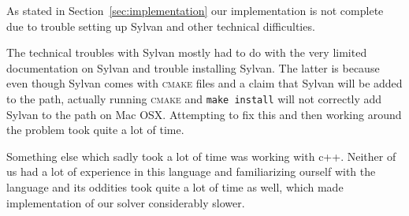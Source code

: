 As stated in Section~\ref{sec:implementation} our implementation is not
complete due to trouble setting up Sylvan and other technical difficulties.

The technical troubles with Sylvan mostly had to do with the very limited 
documentation on Sylvan and trouble installing Sylvan. The latter is because 
even though Sylvan comes with \textsc{cmake} files and a claim that Sylvan will 
be added to the path, actually running \textsc{cmake} and \texttt{make install}
will not correctly add Sylvan to the path on Mac OSX. Attempting to fix this and
then working around the problem took quite a lot of time. 

Something else which sadly took a lot of time was working with c++. Neither of
us had a lot of experience in this language and familiarizing ourself with the
language and its oddities took quite a lot of time as well, which made 
implementation of our solver considerably slower.